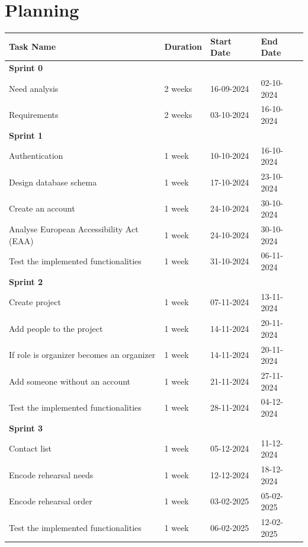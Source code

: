 \documentclass[11pt]{article}
\begin{document}
\section{Planning}
\begin{table}[htbp]
    \centering
    \begin{tabular}{| p{9cm} | p{2cm} | p{2.1cm} | p{2cm} |}
    \hline
    \textbf{Task Name} & \textbf{Duration} & \textbf{Start Date} & \textbf{End Date} \\
    \hline
    \textbf{Sprint 0} &&&\\
    \quad Need analysis & 2 weeks & 16-09-2024 & 02-10-2024 \\
    \quad Requirements & 2 weeks & 03-10-2024 & 16-10-2024 \\
    \textbf{Sprint 1} &&&\\
    \quad Authentication & 1 week & 10-10-2024 & 16-10-2024 \\
    \quad Design database schema & 1 week & 17-10-2024 & 23-10-2024 \\
    \quad Create an account & 1 week & 24-10-2024 & 30-10-2024 \\
    \quad Analyse European Accessibility Act (EAA) & 1 week & 24-10-2024 & 30-10-2024 \\
    \quad Test the implemented functionalities & 1 week & 31-10-2024 & 06-11-2024\\
    \textbf{Sprint 2} &&&\\
    \quad Create project & 1 week & 07-11-2024 & 13-11-2024 \\
    \quad Add people to the project & 1 week & 14-11-2024 & 20-11-2024 \\
    \quad If role is organizer becomes an organizer & 1 week & 14-11-2024 & 20-11-2024 \\
    \quad Add someone without an account & 1 week & 21-11-2024 & 27-11-2024 \\
    \quad Test the implemented functionalities & 1 week & 28-11-2024 & 04-12-2024\\
    \textbf{Sprint 3} &&&\\
    \quad Contact list & 1 week & 05-12-2024 & 11-12-2024 \\
    \quad Encode rehearsal needs & 1 week & 12-12-2024 & 18-12-2024 \\
    \quad Encode rehearsal order & 1 week & 03-02-2025 & 05-02-2025 \\
    \quad Test the implemented functionalities & 1 week & 06-02-2025 & 12-02-2025\\

\end{tabular}
\end{table}
\end{document}
